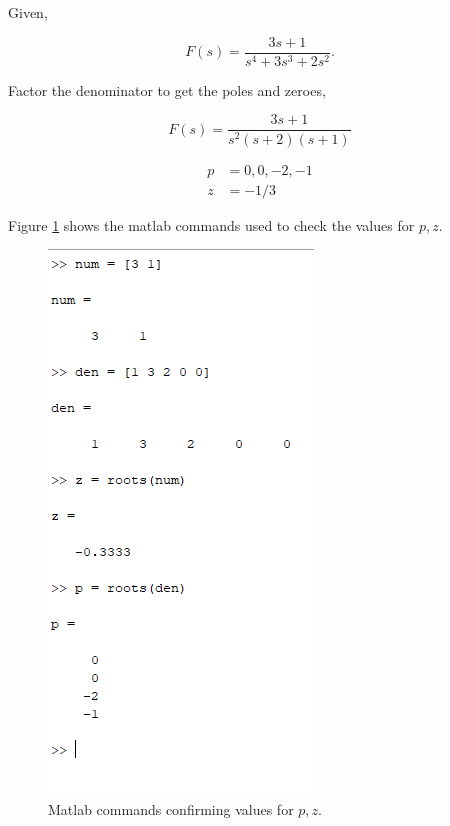 \documentclass[12pt]{article}
\numberwithin{equation}{section}
\begin{document}
  \section{}

  Given,

  \[
      F(s) = \frac{3s + 1}{s^4 + 3s^3 + 2s^2}
    .\]

  Factor the denominator to get the poles and zeroes,

  \begin{equation}
    F(s) = \frac{3s + 1}{s ^2 (s + 2)(s + 1)}
  \end{equation}

  \begin{align*}
    p &= 0,0,-2,-1 \\
    z &= -1/3
  \end{align*}

  Figure \ref{fig:fig2} shows the matlab commands used to check the values for $ p, z. $

  \begin{figure}
    \centering
    \includegraphics{figures/rootsandpoles.png}
    \caption{Matlab commands confirming values for $ p, z. $}
    \label{fig:fig2}
  \end{figure}
\end{document}
